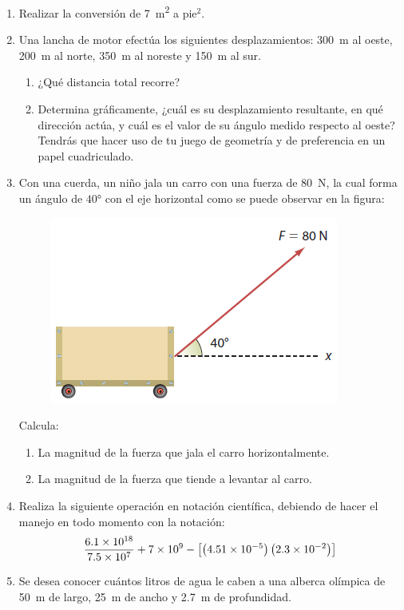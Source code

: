 \documentclass[14pt]{extarticle}
\begin{document}
\begin{enumerate}
\item Realizar la conversión de \SI{7}{\square\meter} a pie$^{2}$.
\item Una lancha de motor efectúa los siguientes desplazamientos: \SI{300}{\meter} al oeste, \SI{200}{\meter} al norte, \SI{350}{\meter} al noreste y \SI{150}{\meter} al sur.
\begin{enumerate}[label=\alph*)]
\item ¿Qué distancia total recorre?
\item Determina gráficamente, ¿cuál es su desplazamiento resultante, en qué dirección actúa, y cuál es el valor de su ángulo medido respecto al oeste? Tendrás que hacer uso de tu juego de geometría y de preferencia en un papel cuadriculado.
\end{enumerate}
\item Con una cuerda, un niño jala un carro con una fuerza de \SI{80}{\newton}, la cual forma un ángulo de $\ang{40}$ con el eje horizontal como se puede observar en la figura:
\begin{figure}[H]
     \centering
     \includegraphics[scale=1]{Imagenes/Ejercicio_Opcional_01.png}
\end{figure}
Calcula:
\begin{enumerate}[label=\alph*)]
\item La magnitud de la fuerza que jala el carro horizontalmente.
\item La magnitud de la fuerza que tiende a levantar al carro.
\end{enumerate}
\item Realiza la siguiente operación en notación científica, debiendo de hacer el manejo en todo momento con la notación:
\begin{align*}
\dfrac{\num{6.1d18}}{\num{7.5d7}} + \num{7d9} - \left[ \left( \num{4.51d-5} \right) \left( \num{2.3d-2} \right)\right]
\end{align*}
\item Se desea conocer cuántos litros de agua le caben a una alberca olímpica de \SI{50}{\meter} de largo,
\SI{25}{\meter} de ancho y \SI{2.7}{\meter} de profundidad.
\end{enumerate}
\end{document}
